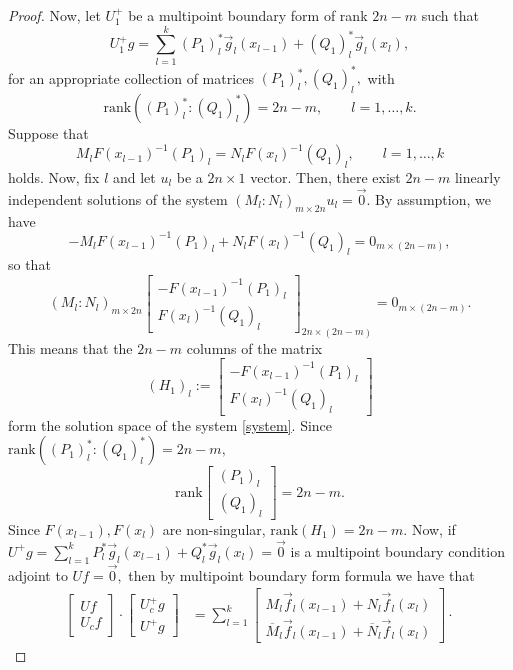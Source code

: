 \documentclass[11pt,reqno,oneside,a4paper]{article}
\theoremstyle{plain} %
\theoremstyle{definition}
\theoremstyle{remark}
\begin{document}
\begin{proof}
Now, let $U_1^+$ be a multipoint boundary form of rank $2n-m$ such that 
\[ 
U_1^+ g = \sum^k_{l=1} (P_1)^*_l \vec{g}_l(x_{l-1}) + (Q_1)^*_l \vec{g}_l(x_l),
\]
for an appropriate collection of matrices $(P_1)^*_l, (Q_1)^*_l,$ with 
\[\mathrm{rank}((P_1)^*_l : (Q_1)^*_l) = 2n-m, \qquad l = 1,\ldots, k.\]
 Suppose that 
\[ M_l  F(x_{l-1})^{-1} (P_1)_l = N_l F(x_l)^{-1}(Q_1)_l, \qquad l = 1,\ldots, k \]
holds. Now, fix $l$ and let $u_l$ be a $2n\times 1$ vector. Then, there exist $2n-m$ linearly independent solutions of the system $(M_l : N_l)_{m\times 2n}u_l = \vec{0}.$ By assumption, we have 
\[
-  M_l  F(x_{l-1})^{-1} (P_1)_l + N_l F(x_l)^{-1}(Q_1)_l   =  0_{m\times (2n-m)},
\]
so that 
\begin{equation}\label{system}
(M_l : N_l)_{m\times 2n} 
\begin{bmatrix}
-F(x_{l-1})^{-1} (P_1)_l \\
F(x_l)^{-1}(Q_1)_l
\end{bmatrix}_{2n\times(2n-m)} = 0_{m \times(2n-m)}. 
\end{equation}
This means that the $2n-m$ columns of the matrix 
\[ (H_1)_l := \begin{bmatrix}
-F(x_{l-1})^{-1} (P_1)_l \\
F(x_l)^{-1}(Q_1)_l
\end{bmatrix}
\]
form the solution space of the system \eqref{system}. Since $\mathrm{rank}((P_1)^*_l : (Q_1)^*_l) = 2n-m,$
\[ 
\mathrm{rank}
\begin{bmatrix}
(P_1)_l \\
(Q_1)_l
\end{bmatrix}
= 2n-m.
\] 
Since $F(x_{l-1}), F(x_{l})$ are non-singular, $\mathrm{rank}(H_1) = 2n - m.$
Now, if $U^+g = \sum^k_{l=1} P^*_l \vec{g}_l(x_{l-1}) + Q^*_l \vec{g}_l(x_l) = \vec{0}$ is a multipoint boundary condition adjoint to $Uf = \vec{0},$ then by multipoint boundary form formula we have that 
\begin{align*}
\begin{bmatrix}
Uf \\
U_c f
\end{bmatrix} \cdot 
\begin{bmatrix}
U^+_cg \\
U^+ g
\end{bmatrix} 
&= 
\sum^k_{l=1} 
\begin{bmatrix}
M_l  \vec{f}_l(x_{l-1}) + N_l \vec{f}_l(x_l) \\
\overline{M}_l \vec{f}_l(x_{l-1}) +\overline{N}_l \vec{f}_l(x_l) 
\end{bmatrix} \cdot 

\end{align*}
\end{proof}
\end{document}
